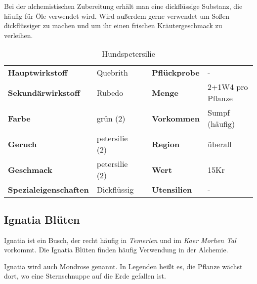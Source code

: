 Bei der alchemistischen Zubereitung erhält man eine dickflüssige Substanz, die häufig für Öle verwendet wird. Wird außerdem gerne verwendet um Soßen dickflüssiger zu machen und um ihr einen frischen Kräutergeschmack zu verleihen.
\newpage
\begin{table}[h] 
\begin{center} 
\begin{tabular}{|l|l|p{1cm}|l|l|} 
  	\cline{1-2} \cline{4-5} 
  	\textbf{Hauptwirkstoff} & Quebrith && \textbf{Pflückprobe} & - \\ \cline{1-2} \cline{4-5} 
  	\textbf{Sekundärwirkstoff} & Rubedo && \textbf{Menge} & 2+1W4 pro Pflanze \\ \cline{1-2} \cline{4-5} 
  	\textbf{Farbe} & grün (2) && \textbf{Vorkommen} & Sumpf (häufig) \\ \cline{1-2} \cline{4-5} 
  	\textbf{Geruch} & petersilie (2) && \textbf{Region} & überall \\ \cline{1-2} \cline{4-5} 
  	\textbf{Geschmack} & petersilie (2) && \textbf{Wert} & 15Kr \\ \cline{1-2} \cline{4-5} 
  	\textbf{Spezialeigenschaften} & Dickflüssig && \textbf{Utensilien} & - \\ \cline{1-2} \cline{4-5} 
\end{tabular} 
\end{center} 
\caption{Hundspetersilie} 
\label{tab:hundspetersilie} 
\end{table}

\subsection{Ignatia Blüten}
Ignatia ist ein Busch, der recht häufig in \textit{Temerien} und im \textit{Kaer Morhen Tal} vorkommt. Die Ignatia Blüten finden häufig Verwendung in der Alchemie.

Ignatia wird auch Mondrose genannt. In Legenden heißt es, die Pflanze wächst dort, wo eine Sternschnuppe auf die Erde gefallen ist.

